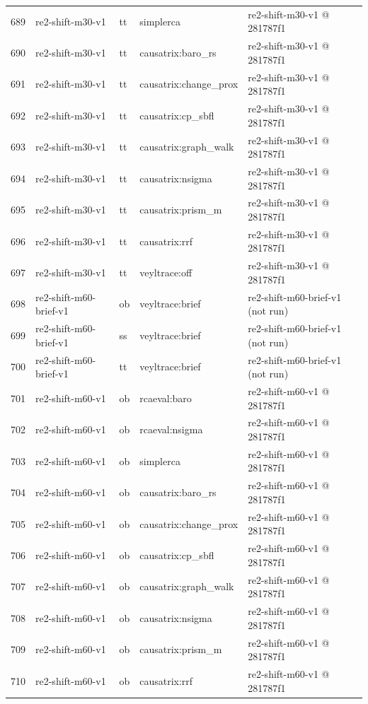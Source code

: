 \begin{longtable}{@{}r>{\raggedright\arraybackslash}p{87.0pt}>{\raggedright\arraybackslash}p{18.0pt}>{\raggedright\arraybackslash}p{63.0pt}>{\raggedright\arraybackslash}p{108.0pt}@{}}
689 & re2-shift-m30-v1 & tt & simplerca & re2-shift-m30-v1 @ 281787f1 \\
690 & re2-shift-m30-v1 & tt & causatrix:baro\_rs & re2-shift-m30-v1 @ 281787f1 \\
691 & re2-shift-m30-v1 & tt & causatrix:change\_prox & re2-shift-m30-v1 @ 281787f1 \\
692 & re2-shift-m30-v1 & tt & causatrix:cp\_sbfl & re2-shift-m30-v1 @ 281787f1 \\
693 & re2-shift-m30-v1 & tt & causatrix:graph\_walk & re2-shift-m30-v1 @ 281787f1 \\
694 & re2-shift-m30-v1 & tt & causatrix:nsigma & re2-shift-m30-v1 @ 281787f1 \\
695 & re2-shift-m30-v1 & tt & causatrix:prism\_m & re2-shift-m30-v1 @ 281787f1 \\
696 & re2-shift-m30-v1 & tt & causatrix:rrf & re2-shift-m30-v1 @ 281787f1 \\
697 & re2-shift-m30-v1 & tt & veyltrace:off & re2-shift-m30-v1 @ 281787f1 \\
698 & re2-shift-m60-brief-v1 & ob & veyltrace:brief & re2-shift-m60-brief-v1 (not run) \\
699 & re2-shift-m60-brief-v1 & ss & veyltrace:brief & re2-shift-m60-brief-v1 (not run) \\
700 & re2-shift-m60-brief-v1 & tt & veyltrace:brief & re2-shift-m60-brief-v1 (not run) \\
701 & re2-shift-m60-v1 & ob & rcaeval:baro & re2-shift-m60-v1 @ 281787f1 \\
702 & re2-shift-m60-v1 & ob & rcaeval:nsigma & re2-shift-m60-v1 @ 281787f1 \\
703 & re2-shift-m60-v1 & ob & simplerca & re2-shift-m60-v1 @ 281787f1 \\
704 & re2-shift-m60-v1 & ob & causatrix:baro\_rs & re2-shift-m60-v1 @ 281787f1 \\
705 & re2-shift-m60-v1 & ob & causatrix:change\_prox & re2-shift-m60-v1 @ 281787f1 \\
706 & re2-shift-m60-v1 & ob & causatrix:cp\_sbfl & re2-shift-m60-v1 @ 281787f1 \\
707 & re2-shift-m60-v1 & ob & causatrix:graph\_walk & re2-shift-m60-v1 @ 281787f1 \\
708 & re2-shift-m60-v1 & ob & causatrix:nsigma & re2-shift-m60-v1 @ 281787f1 \\
709 & re2-shift-m60-v1 & ob & causatrix:prism\_m & re2-shift-m60-v1 @ 281787f1 \\
710 & re2-shift-m60-v1 & ob & causatrix:rrf & re2-shift-m60-v1 @ 281787f1 \\

\end{longtable}
